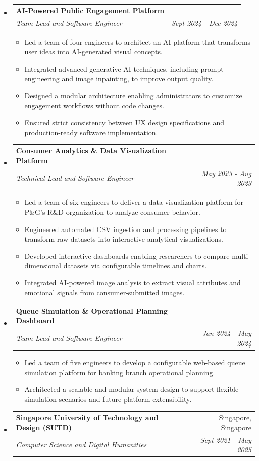 \documentclass[letterpaper,11pt]{article}
\makeatletter
\newlength{\outerbordwidth}
\newcommand{\resitem}[1]{\item #1 \vspace{-2pt}}
\newcommand{\resheading}[1]{\vspace{6pt}
    \parbox{\textwidth}{\setlength{\FrameSep}{\outerbordwidth}
        \begin{shaded}
    \setlength{\fboxsep}{0pt}\framebox[\textwidth][l]{\setlength{\fboxsep}{2pt}\fcolorbox{shadecolorB}{shadecolorB}{\textbf{\sffamily{\mbox{~}\makebox[6.8in][l]{\large #1} \vphantom{p\^{E}}}}}}
        \end{shaded}
    }\vspace{-6pt}
    }
\newcommand{\ressubheading}[4]{
    \begin{tabular*}{6.5in}{p{4.8in}@{\extracolsep{\fill}}r}
            \textbf{#1} & #2 \\
            \textit{#3} & \textit{#4} \\
    \end{tabular*}\vspace{-8pt}}
\makeatother
\begin{document}
      \begin{itemize}
        \item \ressubheading{AI-Powered Public Engagement Platform}{}{Team Lead and Software Engineer}{Sept 2024 - Dec 2024}
        \begin{itemize}
            \resitem{Led a team of four engineers to architect an AI platform that transforms user ideas into AI-generated visual concepts.}
            \resitem{Integrated advanced generative AI techniques, including prompt engineering and image inpainting, to improve output quality.}
            \resitem{Designed a modular architecture enabling administrators to customize engagement workflows without code changes.}
            \resitem{Ensured strict consistency between UX design specifications and production-ready software implementation.}
        \end{itemize}
        \item \ressubheading{Consumer Analytics \& Data Visualization Platform}{}{Technical Lead and Software Engineer}{May 2023 - Aug 2023}
        \begin{itemize}
            \resitem{Led a team of six engineers to deliver a data visualization platform for P\&G's R\&D organization to analyze consumer behavior.}
            \resitem{Engineered automated CSV ingestion and processing pipelines to transform raw datasets into interactive analytical visualizations.}
            \resitem{Developed interactive dashboards enabling researchers to compare multi-dimensional datasets via configurable timelines and charts.}
            \resitem{Integrated AI-powered image analysis to extract visual attributes and emotional signals from consumer-submitted images.}
        \end{itemize}
        \item \ressubheading{Queue Simulation \& Operational Planning Dashboard}{}{Team Lead and Software Engineer}{Jan 2024 - May 2024}
        \begin{itemize}
            \resitem{Led a team of five engineers to develop a configurable web-based queue simulation platform for banking branch operational planning.}
            \resitem{Architected a scalable and modular system design to support flexible simulation scenarios and future platform extensibility.}
        \end{itemize}
      \end{itemize}
	    \resheading{Education}
	    \begin{itemize}
		    \item \ressubheading{Singapore University of Technology and Design (SUTD)}{Singapore, Singapore}{Computer Science and Digital Humanities}{Sept 2021 - May 2025}
      \end{itemize}
\end{document}
